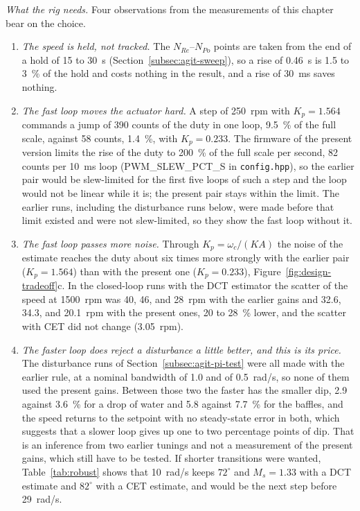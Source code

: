 \emph{What the rig needs.} Four observations from the measurements of this chapter bear on the choice.
\begin{enumerate}
    \item \emph{The speed is held, not tracked.} The $N_{Re}$--$N_{Po}$ points are taken from the end of a hold of 15 to 30~s (Section~\ref{subsec:agit-sweep}), so a rise of 0.46~s is 1.5 to 3~\% of the hold and costs nothing in the result, and a rise of 30~ms saves nothing.
    \item \emph{The fast loop moves the actuator hard.} A step of 250~rpm with $K_p = 1.564$ commands a jump of 390 counts of the duty in one loop, 9.5~\% of the full scale, against 58 counts, 1.4~\%, with $K_p = 0.233$. The firmware of the present version limits the rise of the duty to 200~\% of the full scale per second, 82 counts per 10~ms loop (PWM\_SLEW\_PCT\_S in \texttt{config.hpp}), so the earlier pair would be slew-limited for the first five loops of such a step and the loop would not be linear while it is; the present pair stays within the limit. The earlier runs, including the disturbance runs below, were made before that limit existed and were not slew-limited, so they show the fast loop without it.
    \item \emph{The fast loop passes more noise.} Through $K_p = \omega_c/(KA)$ the noise of the estimate reaches the duty about six times more strongly with the earlier pair ($K_p = 1.564$) than with the present one ($K_p = 0.233$), Figure~\ref{fig:design-tradeoff}c. In the closed-loop runs with the DCT estimator the scatter of the speed at 1500~rpm was 40, 46, and 28~rpm with the earlier gains and 32.6, 34.3, and 20.1~rpm with the present ones, 20 to 28~\% lower, and the scatter with CET did not change (3.05~rpm).
    \item \emph{The faster loop does reject a disturbance a little better, and this is its price.} The disturbance runs of Section~\ref{subsec:agit-pi-test} were all made with the earlier rule, at a nominal bandwidth of 1.0 and of 0.5~rad/s, so none of them used the present gains. Between those two the faster has the smaller dip, 2.9 against 3.6~\% for a drop of water and 5.8 against 7.7~\% for the baffles, and the speed returns to the setpoint with no steady-state error in both, which suggests that a slower loop gives up one to two percentage points of dip. That is an inference from two earlier tunings and not a measurement of the present gains, which still have to be tested. If shorter transitions were wanted, Table~\ref{tab:robust} shows that 10~rad/s keeps $72^{\circ}$ and $M_s = 1.33$ with a DCT estimate and $82^{\circ}$ with a CET estimate, and would be the next step before 29~rad/s.
\end{enumerate}

